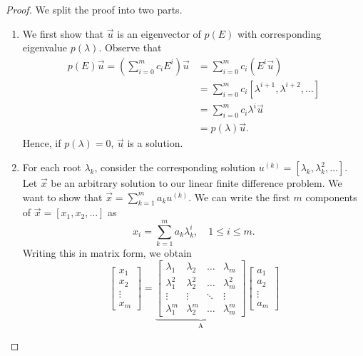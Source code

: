 \documentclass[12pt]{article}
\theoremstyle{plain}
\theoremstyle{definition}
\theoremstyle{remark}
\numberwithin{equation}{section}  %
\begin{document}
\begin{proof} We split the proof into two parts.
	\begin{enumerate}
		\item 
			We first show that $\vec{u}$ is an eigenvector of $p(E)$ with corresponding
			eigenvalue $p(\lambda)$. Observe that
			\begin{align*}
				p(E) \vec{u} = \left(\sum_{i=0}^m c_i E^i \right) \vec{u}
				& = \sum_{ i = 0}^m c_i \left( E^i \vec{u}\right)
				\\
				& = \sum_{i = 0}^m c_i [\lambda^{i+1}, \lambda^{i+2}, \ldots]
				\\
				& = \sum_{i = 0}^m c_i \lambda^i \vec{u}
				\\
				& = p(\lambda) \vec{u}.	 
			\end{align*}
			Hence, if $p(\lambda) = 0$, $\vec{u}$ is a solution.
		\item
			\label{simple}
			For each root $\lambda_k$, consider the corresponding solution $u^{(k)} =
			[\lambda_k, \lambda_k^2, \ldots]$. Let $\vec{x}$ be an arbitrary solution to our
			linear finite difference problem. We want to show that $\vec{x} = \sum_{k=1}^m
			a_k u^{(k)}$. We can write
			the first $m$ components of $\vec{x} = [x_1, x_2, \ldots]$ as 
			\begin{equation}
				\label{det}
				x_i = \sum_{k=1}^{m} a_k \lambda_k^i, \quad 1 \le i \le m.
			\end{equation}
			Writing this in matrix form, we obtain
			\begin{equation*}
				\begin{bmatrix}
					x_1 \\ x_2 \\ \vdots \\ x_m
				\end{bmatrix}
				= 
				\underbrace{
					\begin{bmatrix}
						\lambda_1 & \lambda_2 & \ldots & \lambda_m \\
						\lambda_1^2 & \lambda_2^2 & \ldots & \lambda_m^2 \\
						\vdots & \vdots & \ddots & \vdots \\
						\lambda_1^m & \lambda_2^m & \ldots & \lambda_m^m 
					\end{bmatrix}
				}_\text{A}
				\begin{bmatrix}
					a_1 \\ a_2 \\ \vdots \\ a_m
				\end{bmatrix}

\end{equation*}
\end{enumerate}
\end{proof}
\end{document}
